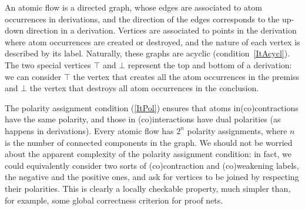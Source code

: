\documentclass[a4paper]{LMCS}
\begin{document}
An atomic flow is a directed graph, whose edges are associated to atom occurrences in derivations, and the direction of the edges corresponds to the up-down direction in a derivation. Vertices are associated to points in the derivation where atom occurrences are created or destroyed, and the nature of each vertex is described by its label. Naturally, these graphs are acyclic (condition~\ref{ItAcycl}). The two special vertices $\top$ and $\bot$ represent the top and bottom of a derivation: we can consider $\top$ the vertex that creates all the atom occurrences in the premiss and $\bot$ the vertex that destroys all atom occurrences in the conclusion.

The polarity assignment condition (\ref{ItPol}) ensures that atoms in(co)contractions have the same polarity, and those in (co)interactions have dual polarities (as happens in derivations). Every atomic flow has $2^n$ polarity assignments, where $n$ is the number of connected components in the graph. We should not be worried about the apparent complexity of the polarity assignment condition: in fact, we could equivalently consider two sorts of (co)contraction and (co)weakening labels, the negative and the positive ones, and ask for vertices to be joined by respecting their polarities. This is clearly a locally checkable property, much simpler than, for example, some global correctness criterion for proof nets.
\end{document}

